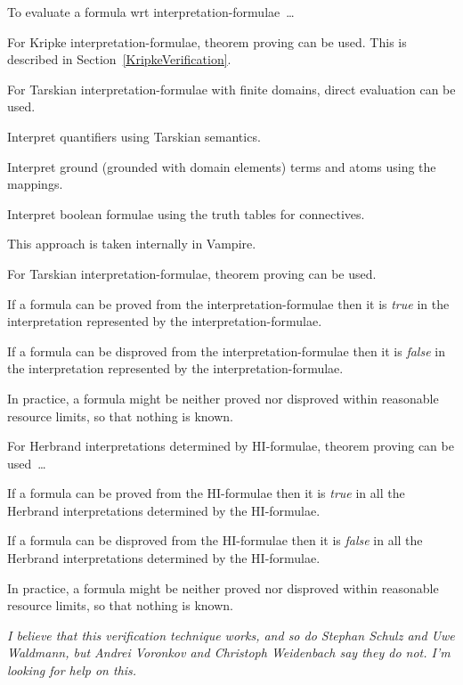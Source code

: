 \documentclass{easychair}
\newenvironment{packed_itemize}{
\vspace*{-0.3em}
\begin{itemize}
\setlength{\partopsep}{0pt}
\setlength{\itemsep}{1pt}
\setlength{\parskip}{0pt}
\setlength{\parsep}{0pt}
}{\end{itemize}}
\begin{document}
To evaluate a formula wrt interpretation-formulae~\ldots
\begin{packed_itemize}
\item For Kripke interpretation-formulae, theorem proving can be used.
      This is described in Section~\ref{KripkeVerification}.
\item For Tarskian interpretation-formulae with finite domains, direct evaluation can be used.
      \begin{packed_itemize}
      \item Interpret quantifiers using Tarskian semantics.
      \item Interpret ground (grounded with domain elements) terms and atoms using the mappings.
      \item Interpret boolean formulae using the truth tables for connectives.
      \end{packed_itemize}
      This approach is taken internally in Vampire.
\item For Tarskian interpretation-formulae, theorem proving can be used.
      \begin{packed_itemize}
      \item If a formula can be proved from the interpretation-formulae then it is \textit{true} 
            in the interpretation represented by the interpretation-formulae.
      \item If a formula can be disproved from the interpretation-formulae then it is 
            \textit{false} in the interpretation represented by the interpretation-formulae.
      \item In practice, a formula might be neither proved nor disproved within reasonable 
            resource limits, so that nothing is known.
      \end{packed_itemize}
\item For Herbrand interpretations determined by HI-formulae, theorem proving can be used~\ldots
      \begin{packed_itemize}
      \item If a formula can be proved from the HI-formulae then it is \textit{true} in all 
            the Herbrand interpretations determined by the HI-formulae.
      \item If a formula can be disproved from the HI-formulae then it is \textit{false} in 
            all the Herbrand interpretations determined by the HI-formulae.
      \item In practice, a formula might be neither proved nor disproved within reasonable 
            resource limits, so that nothing is known.
      \end{packed_itemize}
      \emph{I believe that this verification technique works, and so do Stephan Schulz and 
      Uwe Waldmann, but Andrei Voronkov and Christoph Weidenbach say they do not.
      I'm looking for help on this.}
\end{packed_itemize}
\end{document}
